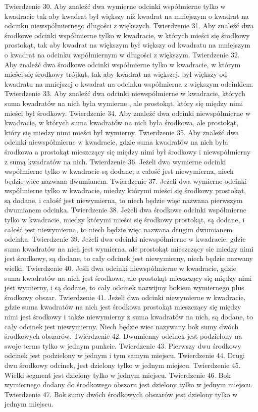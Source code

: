     Twierdzenie 30.
        Aby znaleźć dwa wymierne odcinki współmierne tylko w kwadracie tak aby kwadrat był większy niż kwadrat na mniejszym o kwadrat na odcinku niewspółmiernego długości z większych.
    Twierdzenie 31.
        Aby znaleźć dwa środkowe odcinki współmierne tylko w kwadracie, w których mieści się środkowy prostokąt, tak aby kwadrat na większym był większy od kwadratu na mniejszym o kwadrat na odcinku współmiernym w długości z większym.
    Twierdzenie 32.
        Aby znaleźć dwa środkowe odcinki współmierne tylko w kwadracie, w którym mieści się środkowy trójkąt, tak aby kwadrat na większej, był większy od kwadratu na mniejszej o kwadrat na odcinku współmierna z większym odcinkiem.
    Twierdzenie 33.
        Aby znaleźć dwa odcinki niewspółmierne w kwadracie, których suma kwadratów na nich była wymierne , ale prostokąt, który się między nimi mieści był środkowy.
    Twierdzenie 34.
        Aby znaleźć dwa odcinki niewspółmierne w kwadracie, w których suma kwadratów na nich była środkowa, ale prostokąt, który się miedzy nimi mieści był wymierny.
    Twierdzenie 35.
        Aby znaleźć dwa odcinki niewspółmierne w kwadracie, gdzie suma kwadratów na nich była środkowa a prostokąt mieszczący się między nimi był środkowy i niewspółmierny z sumą kwadratów na nich.
    Twierdzenie 36.
        Jeżeli dwa wymierne odcinki współmierne tylko w kwadracie są dodane, a całość jest niewymierna, niech będzie wiec nazwana dwumianem.
    Twierdzenie 37.
        Jeżeli dwa wymierne odcinki współmierne tylko w kwadracie, miedzy którymi mieści się środkowy prostokąt, są dodane, i całość jest niewymierna, to niech będzie więc nazwana pierwszym dwumianem odcinka.
    Twierdzenie 38.
        Jeżeli dwa środkowe odcinki współmierne tylko w kwadracie, miedzy którymi mieści się środkowy prostokąt, są dodane, i całość jest niewymierna, to niech będzie więc nazwana drugim dwumianem odcinka.
    Twierdzenie 39.
        Jeżeli dwa odcinki niewspółmierne w kwadracie, gdzie suma kwadratów na nich jest wymierna, ale prostokąt mieszczący sie miedzy nimi jest środkowy, są dodane, to cały odcinek jest niewymierny, niech będzie nazwany wielki.
    Twierdzenie 40.
        Jeśli dwa odcinki niewspółmierne w kwadracie, gdzie suma kwadratów na nich jest środkowa, ale prostokąt mieszczący się między nimi jest wymierny, i są dodane, to cały odcinek nazwijmy bokiem wymiernego plus środkowy obszar.
    Twierdzenie 41.
        Jeżeli dwa odcinki niewymierne w kwadracie, gdzie suma kwadratów na nich jest środkowa prostokąt mieszczący się między nimi jest środkowy i także niewymierny z suma kwadratów na nich, są dodane, to cały odcinek jest niewymierny. Niech będzie wiec nazywany bok sumy dwóch środkowych obszarów.
    Twierdzenie 42.
        Dwumienny odcinek jest podzielony na swoje terms tylko w jednym punkcie.
    Twierdzenie 43.
        Pierwszy dwu środkowy odcinek jest podzielony w jednym i tym samym miejscu.
    Twierdzenie 44.
        Drugi dwu środkowy odcinek, jest dzielony tylko w jednym miejscu.
    Twierdzenie 45.
        Wielki segment jest dzielony tylko w jednym miejscu.
    Twierdzenie 46.
        Bok wymiernego dodany do środkowego obszaru jest dzielony tylko w jednym miejscu.
    Twierdzenie 47.
        Bok sumy dwóch środkowych obszarów jest dzielony tylko w jednym miejscu.
    

